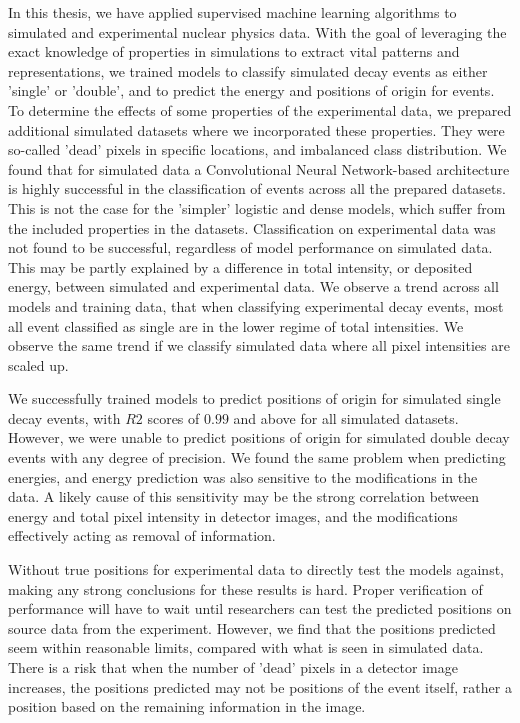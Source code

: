 In this thesis, we have applied supervised machine learning algorithms to simulated and experimental
nuclear physics data. With the goal of leveraging the exact knowledge of properties in simulations to extract
vital patterns and representations, we trained models to classify simulated decay events as either 'single'
or 'double', and to predict the energy and positions of origin for events. To determine the effects of
some properties of the experimental data, we prepared additional simulated datasets where we incorporated
these properties. They were so-called 'dead' pixels in specific locations, and imbalanced class distribution.
We found that for simulated data a Convolutional Neural Network-based architecture is highly successful in the
classification of events across all the prepared datasets. This is not the case for the 'simpler' logistic
and dense models, which suffer from the included properties in the datasets.
Classification on experimental data was not found to be successful, regardless of model performance on
simulated data. This may be partly explained by a difference in total intensity, or deposited energy,
between simulated and experimental data. We observe a trend across all models and training data, that
when classifying experimental decay events, most all event classified as single are in the lower
regime of total intensities. We observe the same trend if we classify simulated data where all pixel
intensities are scaled up.

We successfully trained models to predict positions of origin for simulated single decay events,
with $R2$ scores of $0.99$ and above for all simulated datasets. However, we were unable to
predict positions of origin for simulated double decay events with any degree of precision.
We found the same problem when predicting energies, and energy prediction was also sensitive
to the modifications in the data. A likely cause of this sensitivity may be the strong correlation
between energy and total pixel intensity in detector images, and the modifications effectively
acting as removal of information.

Without true positions for experimental data to directly test the models against,
making any strong conclusions for these results is hard. Proper verification of performance 
will have to wait until researchers can test the predicted positions on source data from the
experiment. However, we find that the positions predicted seem within reasonable limits, compared
with what is seen in simulated data. There is a risk that when the number of 'dead' pixels in a detector
image increases, the positions predicted may not be positions of the event itself, rather a position
based on the remaining information in the image.

